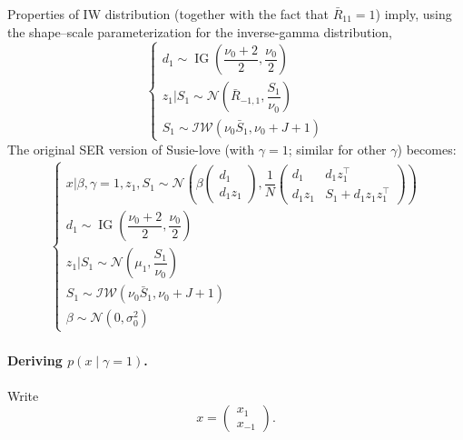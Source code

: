 \documentclass[11pt]{article}
\newcommand{\IG}{\operatorname{IG}}
\begin{document}
Properties of IW distribution (together with the fact that $\bar R_{11} = 1$)
imply, using the shape--scale parameterization for the inverse-gamma
distribution,
\begin{equation}
\begin{cases}
d_1 \sim \IG\left(\dfrac{\nu_0 + 2}{2}, \dfrac{\nu_0}{2}\right) \\
z_1 | S_1 \sim \mathcal{N}\left(\bar R_{-1, 1}, \dfrac{S_1}{\nu_0}\right)\\
S_1 \sim \mathcal{IW}(\nu_0 \bar S_1, \nu_0 + J + 1)
\end{cases}
\end{equation}
The original SER version of Susie-love (with $\gamma = 1$; similar for other $\gamma$) becomes:
\begin{align}\label{eq:SER-model-A} 
\begin{cases}
x | \beta, \gamma = 1, z_1, S_1 \sim \mathcal{N}\left(\beta 
\begin{pmatrix}
d_1  \\
d_1 z_1
\end{pmatrix}, 
\dfrac{1}{N} \begin{pmatrix}
d_1 & d_1 z_1^\top \\
d_1 z_1 & S_1 + d_1 z_1 z_1^\top
\end{pmatrix}\right)\\
d_1 \sim \IG\left(\dfrac{\nu_0 + 2}{2}, \dfrac{\nu_0}{2}\right) \\
z_1 | S_1 \sim \mathcal{N}\left(\mu_1, \dfrac{S_1}{\nu_0}\right)\\
S_1 \sim \mathcal{IW}(\nu_0 \bar S_1, \nu_0 + J + 1)\\
\beta \sim \mathcal{N}(0, \sigma_0^2)
\end{cases}
\end{align}

\paragraph{Deriving $p(x\mid \gamma=1)$.}
Write
\[
x=\begin{pmatrix}x_1\\x_{-1}\end{pmatrix}.
\]
\end{document}
